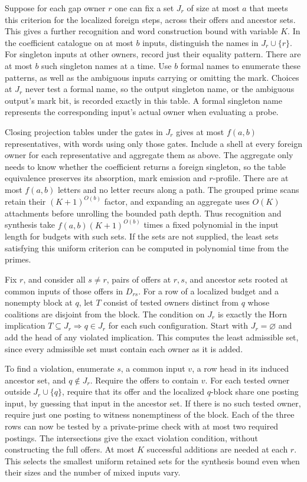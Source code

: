 Suppose for each gap owner $r$ one can fix a set $J_r$
of size at most $a$ that meets this criterion for the
localized foreign steps, across their offers and
ancestor sets. This gives a further recognition and
word construction bound with variable $K$. In the
coefficient catalogue on at most $b$ inputs, distinguish
the names in $J_r\cup\{r\}$. For singleton inputs at
other owners, record just their equality pattern.
There are at most $b$ such singleton names at a time.
Use $b$ formal names to enumerate these patterns,
as well as the ambiguous inputs carrying or omitting
the mark. Choices at $J_r$ never test a formal name,
so the output singleton name, or the ambiguous
output's mark bit, is recorded exactly in this table.
A formal singleton name represents the corresponding
input's actual owner when evaluating a probe.

Closing projection tables under the gates in $J_r$
gives at most $f(a,b)$ representatives, with words
using only those gates. Include a shell at every
foreign owner for each representative and aggregate
them as above. The aggregate only needs to know
whether the coefficient returns a foreign singleton,
so the table equivalence preserves its absorption,
mark emission and $r$-profile. There are at most
$f(a,b)$ letters and no letter recurs along a path.
The grouped prime scans retain their $(K+1)^{O(b)}$
factor, and expanding an aggregate uses $O(K)$
attachments before unrolling the bounded path depth.
Thus recognition and synthesis take $f(a,b)(K+1)^{O(b)}$
times a fixed polynomial in the input length for
budgets with such sets. If the sets are not supplied,
the least sets satisfying this uniform criterion can
be computed in polynomial time from the primes.

Fix $r$, and consider all $s\ne r$, pairs of offers
at $r,s$, and ancestor sets rooted at common inputs
of those offers in $D_{rs}$. For a row of a localized
budget and a nonempty block at $q$, let $T$ consist
of tested owners distinct from $q$ whose coalitions
are disjoint from the block. The condition on $J_r$
is exactly the Horn implication $T\subseteq J_r
\Rightarrow q\in J_r$ for each such configuration.
Start with $J_r=\varnothing$ and add the head of
any violated implication. This computes the least
admissible set, since every admissible set must
contain each owner as it is added.

To find a violation, enumerate $s$, a common input
$v$, a row head in its induced ancestor set, and
$q\notin J_r$. Require the offers to contain $v$.
For each tested owner outside $J_r\cup\{q\}$, require
that its offer and the localized $q$-block share one
posting input, by guessing that input in the ancestor
set. If there is no such tested owner, require just
one posting to witness nonemptiness of the block.
Each of the three rows can now be tested by a
private-prime check with at most two required
postings. The intersections give the exact
violation condition, without constructing the full
offers. At most $K$ successful additions are needed
at each $r$. This selects the smallest uniform
retained sets for the synthesis bound even when
their sizes and the number of mixed inputs vary.

